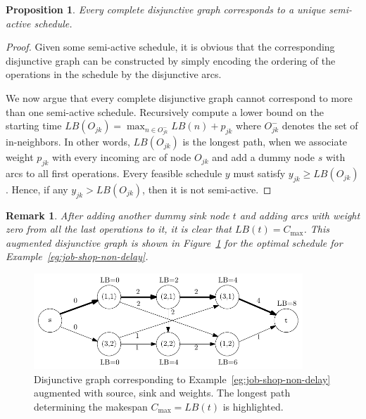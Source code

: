 \documentclass{article}
\theoremstyle{definition}
\theoremstyle{plain}
\newtheorem{proposition}{Proposition}[section]
\newtheorem{remark}{Remark}[section]
\begin{document}
\begin{proposition}
  \label{prop:disjunctive-graph-semi-active}
  Every complete disjunctive graph corresponds to a unique semi-active schedule.
\end{proposition}
\begin{proof}
  Given some semi-active schedule, it is obvious that the corresponding
  disjunctive graph can be constructed by simply encoding the ordering of the
  operations in the schedule by the disjunctive arcs.

  We now argue that every complete disjunctive graph cannot correspond to more than
  one semi-active schedule.
  Recursively compute a lower bound on the starting time
  $LB(O_{jk}) = \max_{n \in O_{jk}^{-}} LB(n) + p_{jk}$ where $O_{jk}^{-}$ denotes
  the set of in-neighbors. In other words, $LB(O_{jk})$ is the longest path, when
  we associate weight $p_{jk}$ with every incoming arc of node $O_{jk}$ and add a
  dummy node $s$ with arcs to all first operations. Every feasible schedule $y$
  must satisfy $y_{jk} \geq LB(O_{jk})$. Hence, if any $y_{jk} > LB(O_{jk})$, then
  it is not semi-active.
\end{proof}

\begin{remark}
  After adding another dummy \textit{sink} node $t$ and adding arcs with weight
  zero from all the last operations to it, it is clear that
  $LB(t) = C_\text{max}$. This augmented disjunctive graph is shown in
  Figure~\ref{fig:augmented-graph} for the optimal schedule for
  Example~\ref{eg:job-shop-non-delay}.
\end{remark}

\begin{figure}
  \centering
  \includegraphics[width=0.9\textwidth]{figures/disjunctive-graph-source-sink.pdf}
  \caption{Disjunctive graph corresponding to
    Example~\ref{eg:job-shop-non-delay} augmented with source, sink and weights.
    The longest path determining the makespan $C_{\text{max}} = LB(t)$ is
    highlighted.}
  \label{fig:augmented-graph}
\end{figure}
\end{document}
